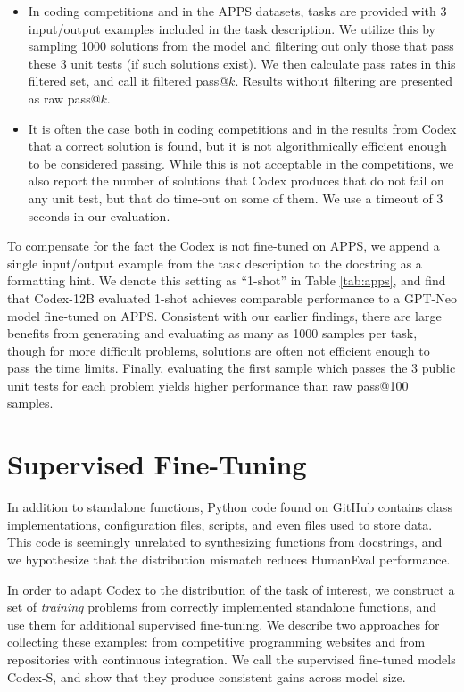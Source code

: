 \begin{itemize}
    \item In coding competitions and in the APPS datasets, tasks are provided with 3 input/output examples included in the task description. We utilize this by sampling 1000 solutions from the model and filtering out only those that pass these 3 unit tests (if such solutions exist). We then calculate pass rates in this filtered set, and call it filtered pass@$k$. Results without filtering are presented as raw pass@$k$.
    \item It is often the case both in coding competitions and in the results from Codex that a correct solution is found, but it is not algorithmically efficient enough to be considered passing. While this is not acceptable in the competitions, we also report the number of solutions that Codex produces that do not fail on any unit test, but that do time-out on some of them. We use a timeout of 3 seconds in our evaluation.
\end{itemize}

To compensate for the fact the Codex is not fine-tuned on APPS, we append a single input/output example from the task description to the docstring as a formatting hint. We denote this setting as ``1-shot'' in Table \ref{tab:apps}, and find that Codex-12B evaluated 1-shot achieves comparable performance to a GPT-Neo model fine-tuned on APPS. Consistent with our earlier findings, there are large benefits from generating and evaluating as many as 1000 samples per task, though for more difficult problems, solutions are often not efficient enough to pass the time limits. Finally, evaluating the first sample which passes the 3 public unit tests for each problem yields higher performance than raw pass@100 samples.

\section{Supervised Fine-Tuning}
\label{sec:sup}

In addition to standalone functions, Python code found on GitHub contains class implementations, configuration files, scripts, and even files used to store data. This code is seemingly unrelated to synthesizing functions from docstrings, and we hypothesize that the distribution mismatch reduces HumanEval performance.

In order to adapt Codex to the distribution of the task of interest, we construct a set of \textit{training} problems from correctly implemented standalone functions, and use them for additional supervised fine-tuning. We describe two approaches for collecting these examples: from competitive programming websites and from repositories with continuous integration. We call the supervised fine-tuned models Codex-S, and show that they produce consistent gains across model size.

